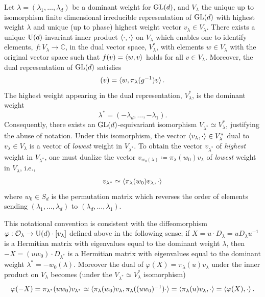 \documentclass[notitlepage, 10pt]{article}
\begin{document}
\begin{rem}
    Let $\lambda = (\lambda_1, \ldots, \lambda_d)$ be a dominant weight for $\operatorname{GL}(d)$, and $V_{\lambda}$ the unique up to isomorphism finite dimensional irreducible representation of $\operatorname{GL}(d)$ with highest weight $\lambda$ and unique (up to phase) highest weight vector $v_{\lambda} \in V_{\lambda}$.
    There exists a unique $\operatorname{U}(d)$-invariant inner product $\braket{\cdot,\cdot}$ on $V_{\lambda}$ which enables one to identify elements, $f : V_{\lambda} \to \mathbb C$, in the dual vector space, $V_{\lambda}^{*}$, with elements $w \in V_{\lambda}$ with the original vector space such that $f(v) = \braket{w, v}$ holds for all $v \in V_{\lambda}$. Moreover, the dual representation of $\operatorname{GL}(d)$ satisfies
    \begin{equation}
        [\pi^{*}_{\lambda}(g) f](v) = \braket{w, \pi_{\lambda}(g^{-1})v}.
    \end{equation}
    The highest weight appearing in the dual representation, $V_{\lambda}^{*}$, is the dominant weight
    \begin{equation}
        \lambda^{*} = (-\lambda_d, \ldots, -\lambda_1).
    \end{equation}
    Consequently, there exists an $\operatorname{GL}(d)$-equivariant isomorphism $V_{\lambda^{*}} \simeq V_{\lambda}^{*}$, justifying the abuse of notation.
    Under this isomorphism, the vector $\braket{v_{\lambda}, \cdot} \in V_{\lambda}^{*}$ dual to $v_{\lambda} \in V_{\lambda}$ is a vector of \textit{lowest} weight in $V_{\lambda^{*}}$.
    To obtain the vector $v_{\lambda^{*}}$ of \textit{highest} weight in $V_{\lambda^{*}}$, one must dualize the vector $v_{w_0(\lambda)} \coloneqq \pi_{\lambda}(w_0) v_{\lambda}$ of \textit{lowest} weight in $V_{\lambda}$, i.e., 
    \begin{equation}
        v_{\lambda^{*}} \simeq \braket{\pi_{\lambda}(w_0) v_{\lambda},\cdot}
    \end{equation}
    where $w_0 \in S_d$ is the permutation matrix which reverses the order of elements sending $(\lambda_1, \ldots, \lambda_d)$ to $(\lambda_d, \ldots, \lambda_1)$.

    This notational convention is consistent with the diffeomorphism $\varphi : \mathcal O_{\lambda} \to \operatorname{U}(d) \cdot [v_{\lambda}]$ defined above in the following sense; if $X = u \cdot D_{\lambda} = uD_{\lambda}u^{-1}$ is a Hermitian matrix with eigenvalues equal to the dominant weight $\lambda$, then $-X = (uw_0)\cdot D_{\lambda^{*}}$ is a Hermitian matrix with eigenvalues equal to the dominant weight $\lambda^{*} = - w_0(\lambda)$.
    Moreover the dual of $\varphi(X) = \pi_{\lambda}(u) v_{\lambda}$ under the inner product on $V_{\lambda}$ becomes (under the $V_{\lambda^*} \simeq V_{\lambda}^{*}$ isomorphism)
    \begin{equation}
        \varphi(-X) 
        = \pi_{\lambda^{*}}(uw_0) v_{\lambda^{*}}
        \simeq \braket{\pi_{\lambda}(w_0) v_{\lambda}, \pi_{\lambda}((uw_0)^{-1}) \cdot}
        = \braket{\pi_{\lambda}(u)v_{\lambda}, \cdot}
        = \braket{\varphi(X), \cdot}.
    \end{equation}
\end{rem}
\end{document}
